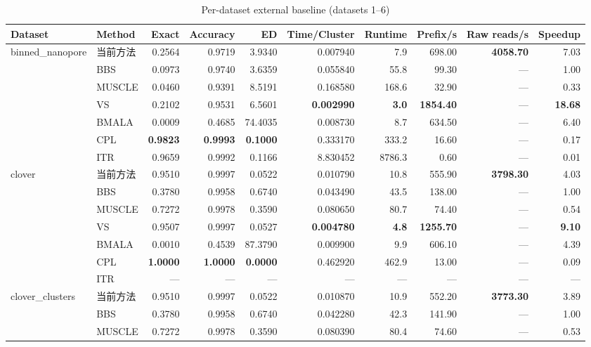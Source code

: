 
\begin{table}[htbp]
\centering
\caption{Per-dataset external baseline (datasets 1–6)}
\label{tab:baselineA}
\small
\begin{tabular}{llrrrrrrrr}
\toprule
Dataset & Method & Exact & Accuracy & ED & Time/Cluster & Runtime & Prefix/s & Raw reads/s & Speedup \\
\midrule
\multirow{7}{*}{binned\_nanopore} & 当前方法 & 0.2564 & 0.9719 & 3.9340 & 0.007940 & 7.9 & 698.00 & \textbf{4058.70} & 7.03 \\
 & BBS & 0.0973 & 0.9740 & 3.6359 & 0.055840 & 55.8 & 99.30 & — & 1.00 \\
 & MUSCLE & 0.0460 & 0.9391 & 8.5191 & 0.168580 & 168.6 & 32.90 & — & 0.33 \\
 & VS & 0.2102 & 0.9531 & 6.5601 & \textbf{0.002990} & \textbf{3.0} & \textbf{1854.40} & — & \textbf{18.68} \\
 & BMALA & 0.0009 & 0.4685 & 74.4035 & 0.008730 & 8.7 & 634.50 & — & 6.40 \\
 & CPL & \textbf{0.9823} & \textbf{0.9993} & \textbf{0.1000} & 0.333170 & 333.2 & 16.60 & — & 0.17 \\
 & ITR & 0.9659 & 0.9992 & 0.1166 & 8.830452 & 8786.3 & 0.60 & — & 0.01 \\
\midrule
\multirow{7}{*}{clover} & 当前方法 & 0.9510 & 0.9997 & 0.0522 & 0.010790 & 10.8 & 555.90 & \textbf{3798.30} & 4.03 \\
 & BBS & 0.3780 & 0.9958 & 0.6740 & 0.043490 & 43.5 & 138.00 & — & 1.00 \\
 & MUSCLE & 0.7272 & 0.9978 & 0.3590 & 0.080650 & 80.7 & 74.40 & — & 0.54 \\
 & VS & 0.9507 & 0.9997 & 0.0527 & \textbf{0.004780} & \textbf{4.8} & \textbf{1255.70} & — & \textbf{9.10} \\
 & BMALA & 0.0010 & 0.4539 & 87.3790 & 0.009900 & 9.9 & 606.10 & — & 4.39 \\
 & CPL & \textbf{1.0000} & \textbf{1.0000} & \textbf{0.0000} & 0.462920 & 462.9 & 13.00 & — & 0.09 \\
 & ITR & — & — & — & — & — & — & — & — \\
\midrule
\multirow{7}{*}{clover\_clusters} & 当前方法 & 0.9510 & 0.9997 & 0.0522 & 0.010870 & 10.9 & 552.20 & \textbf{3773.30} & 3.89 \\
 & BBS & 0.3780 & 0.9958 & 0.6740 & 0.042280 & 42.3 & 141.90 & — & 1.00 \\
 & MUSCLE & 0.7272 & 0.9978 & 0.3590 & 0.080390 & 80.4 & 74.60 & — & 0.53 \\

\end{tabular}
\end{table}
